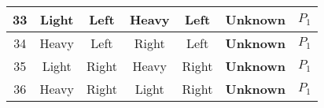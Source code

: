 \begin{table}
\begin{tabular}{|c||c|c||c|c||c||c|}
    33  &  Light   &  Left     &  Heavy   &  Left    &  \textbf{Unknown} & $P_{1}$ \\ \hline
    34  &  Heavy   &  Left     &  Right   &  Left    &  \textbf{Unknown} & $P_{1}$ \\ \hline
    35  &  Light   &  Right    &  Heavy   &  Right   &  \textbf{Unknown} & $P_{1}$ \\ \hline
    36  &  Heavy   &  Right    &  Light   &  Right   &  \textbf{Unknown} & $P_{1}$ \\ \hline
  \end{tabular}
\end{table}